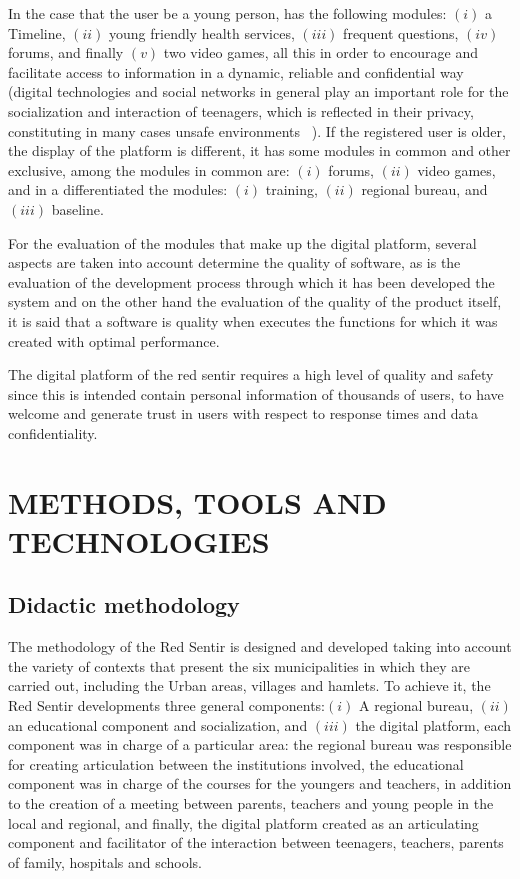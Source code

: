 \documentclass[journal,transmag]{IEEEtran}
\begin{document}
In the case that the user be a young person, has the following modules: $(i)$ a Timeline, $(ii)$ young friendly health services, $(iii)$ frequent questions, $(iv)$ forums, and finally $(v)$ two video games, all this in order to encourage and facilitate access to information in a dynamic, reliable and confidential way (digital technologies and social networks in general play an important role for the socialization and interaction of teenagers, which is reflected in their privacy, constituting in many cases unsafe environments ~\cite{hasinoff2013sexting, boyd2007youth}). If the registered user is older, the display of the platform is different, it has some modules in common and other exclusive, among the modules in common are: $(i)$ forums, $(ii)$ video games, and in a differentiated the modules: $(i)$ training, $(ii)$ regional bureau, and $(iii)$ baseline.

For the evaluation of the modules that make up the digital platform, several aspects are taken into account determine the quality of software, as is the evaluation of the development process through which it has been developed the system and on the other hand the evaluation of the quality of the product itself, it is said that a software is quality when executes the functions for which it was created with optimal performance.

The digital platform of the red sentir requires a high level of quality and safety since this is intended contain personal information of thousands of users, to have welcome and generate trust in users with respect to response times and data confidentiality. 

\section{METHODS, TOOLS AND TECHNOLOGIES}\label{sec:herramientas}

\subsection{Didactic methodology}

The methodology of the Red Sentir is designed and developed taking into account the variety of contexts that present the six municipalities in which they are carried out, including the Urban areas, villages and hamlets. To achieve it, the Red Sentir developments three general components:$(i)$ A regional bureau, $(ii)$ an educational component and socialization, and $(iii)$ the digital platform, each component was in charge of a particular area: the regional bureau was responsible for creating articulation between the institutions involved, the educational component was in charge of the courses for the youngers and teachers, in addition to the creation of a meeting between parents, teachers and young people in the local and regional, and finally, the digital platform created as an articulating component and facilitator of the interaction between teenagers, teachers, parents of family, hospitals and schools.
\end{document}
